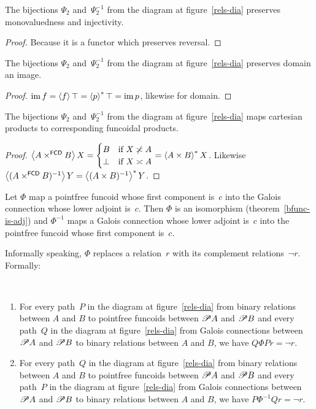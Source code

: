 \begin{prop}
The bijections $\Psi_2$ and~$\Psi_2^{-1}$ from the diagram at figure~\ref{rels-dia} preserves monovaluedness
and injectivity.\end{prop}
\begin{proof}
Because it is a functor which preserves reversal.\end{proof}
\begin{prop}
The bijections $\Psi_2$ and~$\Psi_2^{-1}$ from the diagram at figure~\ref{rels-dia} preserves domain
an image.\end{prop}
\begin{proof}
$\operatorname{im} f=\left\langle f\right\rangle\top=\left\langle p\right\rangle ^{\ast}\top=\operatorname{im} p$, likewise for domain.\end{proof}
\begin{prop}
The bijections $\Psi_2$ and~$\Psi_2^{-1}$ from the diagram at figure~\ref{rels-dia} maps cartesian
products to corresponding funcoidal products.\end{prop}
\begin{proof}
$\left\langle A\times^{\mathsf{FCD}}B\right\rangle X=\begin{cases}
B & \text{if }X\not\asymp A\\
\bot & \text{if }X\asymp A
\end{cases}=\left\langle A\times B\right\rangle ^{\ast}X$. Likewise $\left\langle (A\times^{\mathsf{FCD}}B)^{-1}\right\rangle Y=\left\langle (A\times B)^{-1}\right\rangle ^{\ast}Y$.\end{proof}

Let $\Phi$ map a pointfree funcoid whose first component is~$c$ into the Galois connection whose lower adjoint is~$c$.
Then $\Phi$ is an isomorphism (theorem~\ref{bfunc-is-adj}) and
$\Phi^{-1}$ maps a Galois connection whose lower adjoint is~$c$ into the pointfree funcoid whose first component is~$c$.

Informally speaking, $\Phi$ replaces a relation~$r$ with its complement relations~$\lnot r$. Formally:

\begin{prop}
~
\begin{enumerate}
\item For every path~$P$ in the diagram at figure~\ref{rels-dia} from binary relations between $A$ and $B$
to pointfree funcoids between $\mathscr{P} A$ and $\mathscr{P} B$
and every path~$Q$ in the diagram at figure~\ref{rels-dia} from
Galois connections between $\mathscr{P} A$ and $\mathscr{P} B$
to binary relations between $A$ and $B$,
we have $Q\Phi P r = \lnot r$.

\item For every path~$Q$ in the diagram at figure~\ref{rels-dia} from binary relations between $A$ and $B$
to pointfree funcoids between $\mathscr{P} A$ and $\mathscr{P} B$
and every path~$P$ in the diagram at figure~\ref{rels-dia}
from Galois connections between $\mathscr{P} A$ and $\mathscr{P} B$
to binary relations between $A$ and $B$,
we have $P\Phi^{-1} Q r = \lnot r$.
\end{enumerate}
\end{prop}


